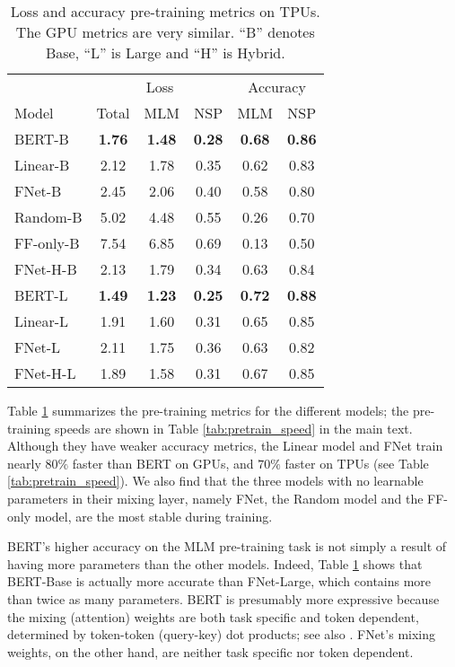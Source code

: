 \documentclass[11pt]{article}
\begin{document}
\begin{table}
    \caption{Loss and accuracy pre-training metrics on TPUs. The GPU metrics are very similar. ``B'' denotes Base, ``L'' is Large and ``H'' is Hybrid.}
    \label{tab:pretraining_metrics}
    \setlength{\tabcolsep}{4.5pt}
    \centering
    \begin{tabular}{l| c c c | c c}
        \hline
         & \multicolumn{3}{c|}{Loss} & \multicolumn{2}{c}{Accuracy} \\ 
         Model & Total & MLM & NSP & MLM & NSP \\ \hline \hline
         BERT-B & \textbf{1.76} & \textbf{1.48} & \textbf{0.28} & \textbf{0.68} & \textbf{0.86} \\ 
         Linear-B & 2.12 & 1.78 & 0.35 & 0.62 & 0.83 \\ 
         FNet-B & 2.45 & 2.06 & 0.40 & 0.58 & 0.80 \\
         Random-B & 5.02 & 4.48 & 0.55 & 0.26 & 0.70 \\ 
         FF-only-B & 7.54 & 6.85 & 0.69 & 0.13 & 0.50 \\
         FNet-H-B & 2.13 & 1.79 & 0.34 & 0.63 & 0.84 \\ \hline
         BERT-L & \textbf{1.49} & \textbf{1.23} & \textbf{0.25} & \textbf{0.72} & \textbf{0.88} \\ 
         Linear-L & 1.91 & 1.60 & 0.31 & 0.65 & 0.85 \\ 
         FNet-L & 2.11 & 1.75 & 0.36 & 0.63 & 0.82 \\
         FNet-H-L & 1.89 & 1.58 & 0.31 & 0.67 & 0.85 \\\hline
    \end{tabular}
\end{table}


Table \ref{tab:pretraining_metrics} summarizes the pre-training metrics for the different models; the pre-training speeds are shown in Table \ref{tab:pretrain_speed} in the main text. Although they have weaker accuracy metrics, the Linear model and FNet train nearly $80\%$ faster than BERT on GPUs, and $70\%$ faster on TPUs (see Table \ref{tab:pretrain_speed}).  We also find that the three models with no learnable parameters in their mixing layer, namely FNet, the  Random model and the FF-only model, are the most stable during training.

BERT's higher accuracy on the MLM pre-training task is not simply a result of having more parameters than the other models. Indeed, Table \ref{tab:pretraining_metrics} shows that BERT-Base is actually more accurate than FNet-Large, which contains more than twice as many parameters. BERT is presumably more expressive because the mixing (attention) weights are both task specific and token dependent, determined by token-token (query-key) dot products; see also \citet{tay2020synthesizer}. FNet's mixing weights, on the other hand, are neither task specific nor token dependent.
\end{document}
